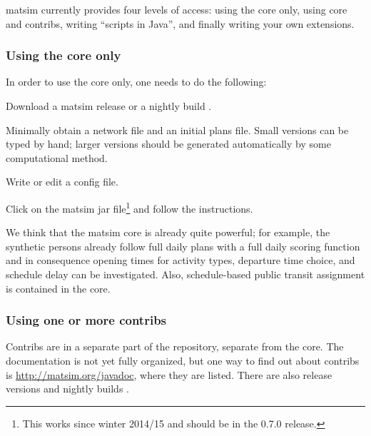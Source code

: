 \acrshort{matsim} currently provides four levels of access: using the core only, using core and contribs, writing ``scripts in Java'', and finally writing your own extensions.

\subsubsection{Using the core only}
\label{sec:using-core-only}
In order to use the core only, one needs to do the following:
\begin{compactitem}
\item Download a \acrshort{matsim} release or a nightly build .
\item Minimally obtain a network file and an initial plans file.  Small versions can be typed by hand; larger versions should be generated automatically by some computational method.
\item Write or edit a config file.
\item Click on the \acrshort{matsim} jar file\footnote{This works since winter 2014/15 and should be in the 0.7.0 release.} and follow the instructions. 
\end{compactitem}
We think that the \acrshort{matsim} core is already quite powerful; for example, the synthetic persons already follow full daily plans with a full daily scoring function and in consequence opening times for activity types, departure time choice, and schedule delay can be investigated.  Also, schedule-based public transit assignment is contained in the core.

\subsubsection{Using one or more contribs}
\label{sec:using-contribs}

Contribs are in a separate part of the repository, separate from the core.  The documentation is not yet fully organized, but one way to find out about contribs is \url{http://matsim.org/javadoc}, where they are listed.  There are also release versions  and nightly builds .


